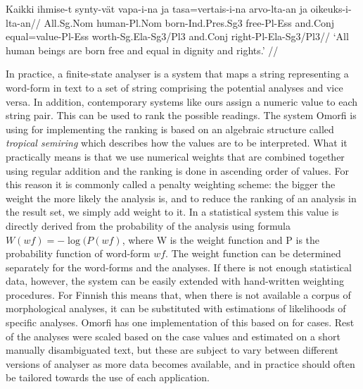 \documentclass[a4paper,12pt]{article}
\begin{document}
\ex
\begingl
\gla Kaikki ihmise-t synty-vät vapa-i-na ja tasa=vertais-i-na arvo-lta-an ja oikeuks-i-lta-an//
\glb All.{\sc Sg.Nom} human-{\sc Pl.Nom} born-{\sc Ind.Pres.Sg3} free-{\sc Pl-Ess} and.{\sc Conj} equal=value-{\sc Pl-Ess} worth-{\sc Sg.Ela-Sg3/Pl3} and.{\sc Conj} right-{\sc Pl-Ela-Sg3/Pl3}//
\glft `All human beings are born free and equal in dignity and rights.' \label{ex:undhr}//
\endgl
\xe


In practice, a finite-state analyser is a system that maps a string
representing a word-form in text to a set of string comprising the potential
analyses and vice versa. In addition, contemporary systems like ours assign a
numeric value to each string pair. This can be used to rank the possible
readings.  The system Omorfi is using for implementing the ranking is based on
an algebraic structure called \emph{tropical semiring} which describes how the
values are to be interpreted. What it practically means is that we use
numerical weights that are combined together using regular addition and the
ranking is done in ascending order of values. For this reason it is commonly
called a penalty weighting scheme: the bigger the weight the more likely the
analysis is, and to reduce the ranking of an analysis in the result set, we
simply add weight to it. In a statistical system this value is directly derived
from the probability of the analysis using formula $W(wf) = -\log(P(wf)$, where
W is the weight function and P is the probability function of word-form $wf$.
The weight function can be determined separately for the word-forms and the
analyses.  If there is not enough statistical data, however, the system can be
easily extended with hand-written weighting procedures. For Finnish this means
that, when there is not available a corpus of morphological analyses, it can be
substituted with estimations of likelihoods of specific analyses. Omorfi has
one implementation of this based on \citet[§ 1227]{visk} for cases. Rest of the
analyses were scaled based on the case values and estimated on a short manually
disambiguated text, but these are subject to vary between different versions of
analyser as more data becomes available, and in practice should often be
tailored towards the use of each application.
\end{document}
